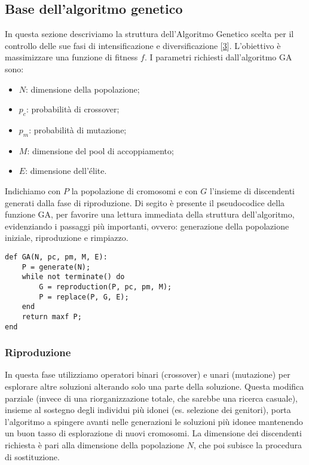 \subsection{Base dell'algoritmo genetico} \hypertarget{ga}{}

In questa sezione descriviamo la struttura dell'Algoritmo Genetico scelta per il controllo delle sue fasi di intensificazione e diversificazione [\hyperlink{bibliografia}{3}].
L'obiettivo è massimizzare una funzione di fitness $f$. I parametri richiesti dall'algoritmo GA sono:

\begin{itemize}
    \item $N$: dimensione della popolazione;
    \item $p_c$: probabilità di crossover;
    \item $p_m$: probabilità di mutazione;
    \item $M$: dimensione del pool di accoppiamento;
    \item $E$: dimensione dell'élite.
\end{itemize}

Indichiamo con $P$ la popolazione di cromosomi e con $G$ l'insieme di discendenti generati dalla fase di riproduzione. Di segito è presente il pseudocodice della funzione GA, per favorire una lettura immediata della struttura dell'algoritmo, evidenziando i passaggi più importanti, ovvero: generazione della popolazione iniziale, riproduzione e rimpiazzo.

\begin{lstlisting}
def GA(N, pc, pm, M, E):
    P = generate(N);
    while not terminate() do
        G = reproduction(P, pc, pm, M);
        P = replace(P, G, E);
    end
    return maxf P;
end
\end{lstlisting}

\subsubsection{Riproduzione}
In questa fase utilizziamo operatori binari (crossover) e unari (mutazione) per esplorare altre soluzioni alterando solo una parte della soluzione. Questa modifica parziale (invece di una riorganizzazione totale, che sarebbe una ricerca casuale), insieme al sostegno degli individui più idonei (es. selezione dei genitori), porta l'algoritmo a spingere avanti nelle generazioni le soluzioni più idonee mantenendo un buon tasso di esplorazione di nuovi cromosomi. La dimensione dei discendenti richiesta è pari alla dimensione della popolazione $N$, che poi subisce la procedura di sostituzione.

